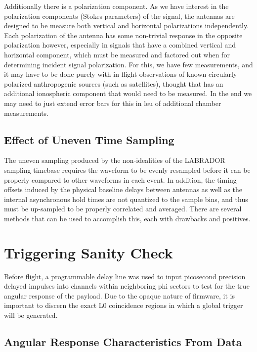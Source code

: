 		Additionally there is a polarization component.  As we have interest in the polarization components (Stokes parameters) of the signal, the antennas are designed to be measure both vertical and horizontal polarizations independently.  Each polarization of the antenna has some non-trivial response in the opposite polarization however, especially in signals that have a combined vertical and horizontal component, which must be measured and factored out when for determining incident signal polarization.  For this, we have few measurements, and it may have to be done purely with in flight observations of known circularly polarized anthropogenic sources (such as satellites), thought that has an additional ionospheric component that would need to be measured.  In the end we may need to just extend error bars for this in leu of additional chamber measurements.
		
	\subsection{Effect of Uneven Time Sampling}
	The uneven sampling produced by the non-idealities of the LABRADOR sampling timebase requires the waveform to be evenly resampled before it can be properly compared to other waveforms in each event.  In addition, the timing offsets induced by the physical baseline delays between antennas as well as the internal asynchronous hold times are not quantized to the sample bins, and thus must be up-sampled to be properly correlated and averaged.  There are several methods that can be used to accomplish this, each with drawbacks and positives.

	

	
	
\section{Triggering Sanity Check}
		Before flight, a programmable delay line was used to input picosecond precision delayed impulses into channels within neighboring phi sectors to test for the true angular response of the payload.  Due to the opaque nature of firmware, it is important to discern the exact L0 coincidence regions in which a global trigger will be generated.
	\subsection{Angular Response Characteristics From Data}

